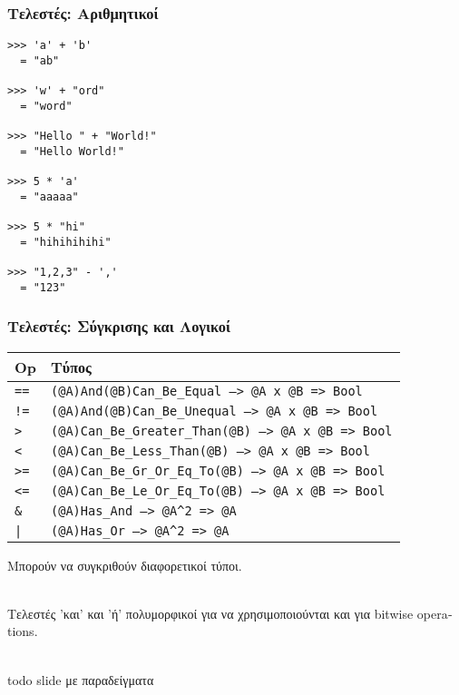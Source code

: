 \documentclass{beamer}
\def\e{\foreignlanguage{english}}
\begin{document}
\begin{frame}[fragile]

\frametitle{Τελεστές: Αριθμητικοί}

\begin{otherlanguage}{english}
\begin{verbatim}
>>> 'a' + 'b'
  = "ab"

>>> 'w' + "ord"
  = "word"

>>> "Hello " + "World!"
  = "Hello World!"

>>> 5 * 'a'
  = "aaaaa"

>>> 5 * "hi"
  = "hihihihihi"

>>> "1,2,3" - ','
  = "123"
\end{verbatim}
\end{otherlanguage}

\end{frame}

\begin{frame}[fragile]

\frametitle{Τελεστές: Σύγκρισης και Λογικοί}

\begin{center}
\begin{tabular}{ |P{0.8cm}|P{9.4cm}| }
 \hline
 \e{Op} & Τύπος
 \\
 \hline
 \e{\texttt{==}} & \e{\texttt{(@A)And(@B)Can\_Be\_Equal --> @A x @B => Bool}}
 \\
 \e{\texttt{!=}} & \e{\texttt{(@A)And(@B)Can\_Be\_Unequal --> @A x @B => Bool}}
 \\
 \e{\texttt{>}} & \e{\texttt{(@A)Can\_Be\_Greater\_Than(@B) --> @A x @B => Bool}}
 \\
 \e{\texttt{<}} & \e{\texttt{(@A)Can\_Be\_Less\_Than(@B) --> @A x @B => Bool}}
 \\
 \e{\texttt{>=}} & \e{\texttt{(@A)Can\_Be\_Gr\_Or\_Eq\_To(@B) --> @A x @B => Bool}}
 \\
 \e{\texttt{<=}} & \e{\texttt{(@A)Can\_Be\_Le\_Or\_Eq\_To(@B) --> @A x @B => Bool}}
 \\
 \e{\texttt{\&}} & \e{\texttt{(@A)Has\_And --> @A}\texttt{\^}\texttt{2 => @A}}
 \\
 \e{\texttt{|}} & \e{\texttt{(@A)Has\_Or --> @A}\texttt{\^}\texttt{2 => @A}}
 \\
 \hline
\end{tabular}
\end{center}

Μπορούν να συγκριθούν διαφορετικοί τύποι.
\\~\

Τελεστές 'και' και 'ή' πολυμορφικοί για να χρησιμοποιούνται και για
\e{bitwise operations}.
\\~\

\e{todo slide} με παραδείγματα
\end{frame}
\end{document}
